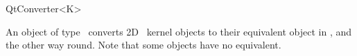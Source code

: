 
\begin{ccRefClass}{QtConverter<K>}

\ccDefinition
An object of type \ccRefName\ converts 2D \cgal\ kernel objects to their equivalent 
object in \qt, and the other way round. Note that some objects have no equivalent.



\end{ccRefClass}








